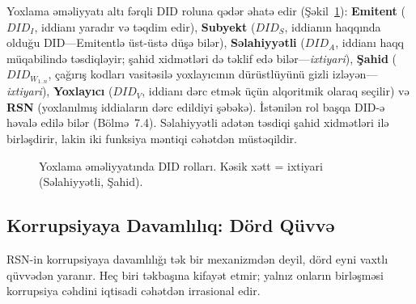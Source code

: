 \documentclass[11pt,a4paper,twocolumn]{article}
\begin{document}
Yoxlama əməliyyatı altı fərqli DID roluna qədər əhatə edir (Şəkil~\ref{fig:roles}): \textbf{Emitent} ($DID_I$, iddianı yaradır və təqdim edir), \textbf{Subyekt} ($DID_S$, iddianın haqqında olduğu DID---Emitentlə üst-üstə düşə bilər), \textbf{Səlahiyyətli} ($DID_A$, iddianı haqq müqabilində təsdiqləyir; şahid xidmətləri də təklif edə bilər---\emph{ixtiyari}), \textbf{Şahid} ($DID_{W_{1..n}}$, çağırış kodları vasitəsilə yoxlayıcının dürüstlüyünü gizli izləyən---\emph{ixtiyari}), \textbf{Yoxlayıcı} ($DID_V$, iddianı dərc etmək üçün alqoritmik olaraq seçilir) və \textbf{RSN} (yoxlanılmış iddiaların dərc edildiyi şəbəkə). İstənilən rol başqa DID-ə həvalə edilə bilər (Bölmə~7.4). Səlahiyyətli adətən təsdiqi şahid xidmətləri ilə birləşdirir, lakin iki funksiya məntiqi cəhətdən müstəqildir.

\begin{figure}[ht]
\centering
{}
\caption{Yoxlama əməliyyatında DID rolları. Kəsik xətt = ixtiyari (Səlahiyyətli, Şahid).}
\label{fig:roles}
\end{figure}

\subsection{Korrupsiyaya Davamlılıq: Dörd Qüvvə}

RSN-in korrupsiyaya davamlılığı tək bir mexanizmdən deyil, dörd eyni vaxtlı qüvvədən yaranır. Heç biri təkbaşına kifayət etmir; yalnız onların birləşməsi korrupsiya cəhdini iqtisadi cəhətdən irrasional edir.
\end{document}
